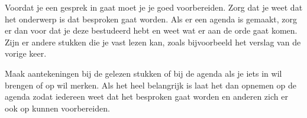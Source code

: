 
Voordat je een gesprek in gaat moet je je goed voorbereiden. Zorg dat je weet dat het onderwerp is dat besproken gaat worden. Als er een agenda is gemaakt, zorg er dan voor dat je deze bestudeerd hebt en weet wat er aan de orde gaat komen. Zijn er andere stukken die je vast lezen kan, zoals bijvoorbeeld het verslag van de vorige keer.

Maak aantekeningen bij de gelezen stukken of bij de agenda als je iets in wil brengen of op wil merken. Als het heel belangrijk is laat het dan opnemen op de agenda zodat iedereen weet dat het besproken gaat worden en anderen zich er ook op kunnen voorbereiden.
